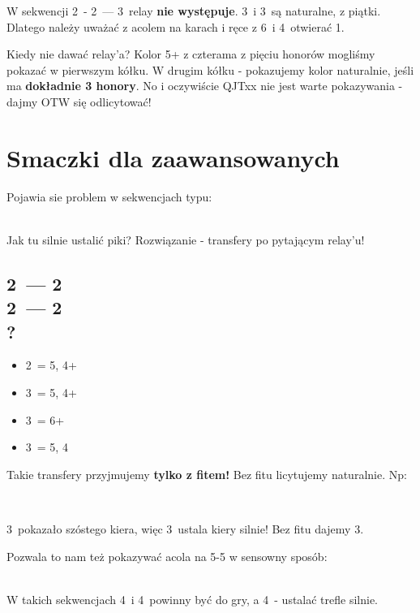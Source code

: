 \documentclass[12pt, a4paper]{article}
\begin{document}
\begin{formal}
    W sekwencji 2\clubs\ - 2\diams\ --- 3\diams\ relay \textbf{nie występuje}. 3\hearts\ i 3\spades\ są naturalne,
    z piątki. Dlatego należy uważać z acolem na karach i ręce z 6\diams\ i 4\major\ otwierać 1\diams.
\end{formal}

Kiedy nie dawać relay'a? Kolor 5+ z czterama z pięciu honorów mogliśmy pokazać w pierwszym kółku.
W drugim kółku - pokazujemy kolor naturalnie, jeśli ma \textbf{dokładnie 3 honory}. No i oczywiście
\diams QJTxx nie jest warte pokazywania - dajmy OTW się odlicytować!

\pagebreak
\section{Smaczki dla zaawansowanych}
\raggedright
Pojawia sie problem w sekwencjach typu: \\[1em]

 \\[1em] \raggedright

Jak tu silnie ustalić piki? Rozwiązanie - transfery po pytającym relay'u!

\subsection*{2\clubs\ --- 2\diams\ \\ 2\hearts\ --- 2\spades\ \\ ?}
\begin{itemize}
    \item 2\nt\ = 5\hearts, 4+\clubs
    \item 3\clubs\ = 5\hearts, 4+\diams
    \item 3\diams\ = 6+\hearts
    \item 3\hearts\ = 5\hearts, 4\spades
\end{itemize}

Takie transfery przyjmujemy \textbf{tylko z fitem!} Bez fitu licytujemy naturalnie. Np:

\webidding{
    2\clubs\ & 2\diams \\
    2\hearts\ & 2\spades \\
    \conventional{3\diams} & 3\hearts
} \\[1em] \raggedright

3\diams\ pokazało szóstego kiera, więc 3\hearts\ ustala kiery silnie! Bez fitu dajemy 3\nt.

\raggedright
Pozwala to nam też pokazywać acola na 5-5 w sensowny sposób: \\[1em]
\webidding{
    2\clubs\ & 2\diams \\
    2\spades\ & 2\nt \\
    \conventional{3\spades} & 3\nt\ \\
    4\clubs\
} \\[1em] \raggedright

W takich sekwencjach 4\spades\ i 4\nt\ powinny być do gry, a 4\diams\ - ustalać trefle silnie.
\end{document}
